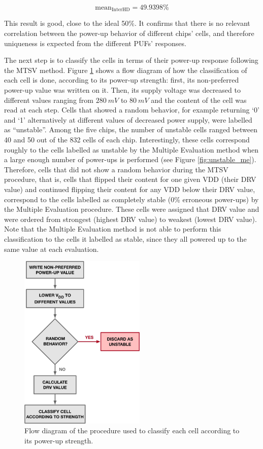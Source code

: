 \begin{equation}
\text{mean}_\text{InterHD}=49.9398 \%
\end{equation}

This result is good, close to the ideal 50\%. It confirms that there is no relevant correlation between the power-up behavior of different chips’ cells, and therefore uniqueness is expected from the different PUFs’ responses.

The next step is to classify the cells in terms of their power-up response following the MTSV method. Figure \ref{fig:mtsvflow} shows a flow diagram of how the classification of each cell is done, according to its power-up strength: first, its non-preferred power-up value was written on it. Then, its supply voltage was decreased to different values ranging from $\SI{280}{mV}$ to $\SI{80}{mV}$ and the content of the cell was read at each step. Cells that showed a random behavior, for example returning ‘0’ and ‘1’ alternatively at different values of decreased power supply, were labelled as “unstable”. Among the five chips, the number of unstable cells ranged between 40 and 50 out of the 832 cells of each chip. Interestingly, these cells correspond roughly to the cells labelled as unstable by the Multiple Evaluation method when a large enough number of power-ups is performed (see Figure \ref{fig:unstable_me}). Therefore, cells that did not show a random behavior during the MTSV procedure, that is, cells that flipped their content for one given VDD (their DRV value) and continued flipping their content for any VDD below their DRV value, correspond to the cells labelled as completely stable (0\% erroneous power-ups) by the Multiple Evaluation procedure. These cells were assigned that DRV value and were ordered from strongest (highest DRV value) to weakest (lowest DRV value). Note that the Multiple Evaluation method is not able to perform this classification to the cells it labelled as stable, since they all powered up to the same value at each evaluation. 


\begin{figure}[H]
    \centering
    \includegraphics[width=6cm]{images/mtsvflow.jpg}
    \caption{Flow diagram of the procedure used to classify each cell according to its power-up strength. }
    \label{fig:mtsvflow}
\end{figure}

